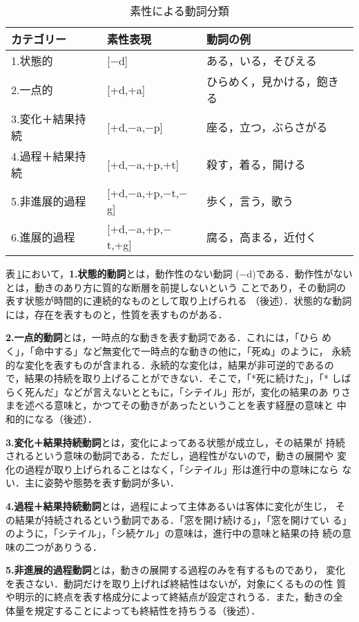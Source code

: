 \begin{table}[h]
\caption{素性による動詞分類}
\label{tab:category}
\centering
\begin{tabular}{|l|l|l|}  \hline
カテゴリー       & 素性表現               & 動詞の例 \\ \hline\hline
1.状態的         & [$-$d]                 & ある，いる，そびえる \\ \hline
2.一点的         & [+d,+a]                & ひらめく，見かける，飽きる \\ \hline
3.変化＋結果持続 & [+d,$-$a,$-$p]         & 座る，立つ，ぶらさがる \\ \hline
4.過程＋結果持続 & [+d,$-$a,+p,+t]        & 殺す，着る，開ける \\ \hline
5.非進展的過程   & [+d,$-$a,+p,$-$t,$-$g] & 歩く，言う，歌う \\ \hline
6.進展的過程     & [+d,$-$a,+p,$-$t,+g]   & 腐る，高まる，近付く \\ \hline
\end{tabular}
\end{table}
\vspace*{-2mm}
表\,\ref{tab:category}において，{\bf 1.状態的動詞}とは，動作性のない動詞
($-$d)である．動作性がないとは，動きのあり方に質的な断層を前提しないという
ことであり，その動詞の表す状態が時間的に連続的なものとして取り上げられる
（後述）．状態的な動詞には，存在を表すものと，性質を表すものがある．

{\bf 2.一点的動詞}とは，一時点的な動きを表す動詞である．これには，「ひら
めく」，「命中する」など無変化で一時点的な動きの他に，「死ぬ」のように，
永続的な変化を表すものが含まれる．永続的な変化は，結果が非可逆的であるの
で，結果の持続を取り上げることができない．そこで，「*死に続けた」，「*
しばらく死んだ」などが言えないとともに，「シテイル」形が，変化の結果のあ
りさまを述べる意味と，かつてその動きがあったということを表す経歴の意味と
中和的になる（後述）．

{\bf 3.変化＋結果持続動詞}とは，変化によってある状態が成立し，その結果が
持続されるという意味の動詞である．ただし，過程性がないので，動きの展開や
変化の過程が取り上げられることはなく，「シテイル」形は進行中の意味になら
ない．主に姿勢や態勢を表す動詞が多い．

{\bf 4.過程＋結果持続動詞}とは，過程によって主体あるいは客体に変化が生じ，
その結果が持続されるという動詞である．「窓を開け続ける」，「窓を開けてい
る」のように，「シテイル」，「シ続ケル」の意味は，進行中の意味と結果の持
続の意味の二つがありうる．

{\bf 5.非進展的過程動詞}とは，動きの展開する過程のみを有するものであり，
変化を表さない．動詞だけを取り上げれば終結性はないが，対象にくるものの性
質や明示的に終点を表す格成分によって終結点が設定されうる．また，動きの全
体量を規定することによっても終結性を持ちうる（後述）．

